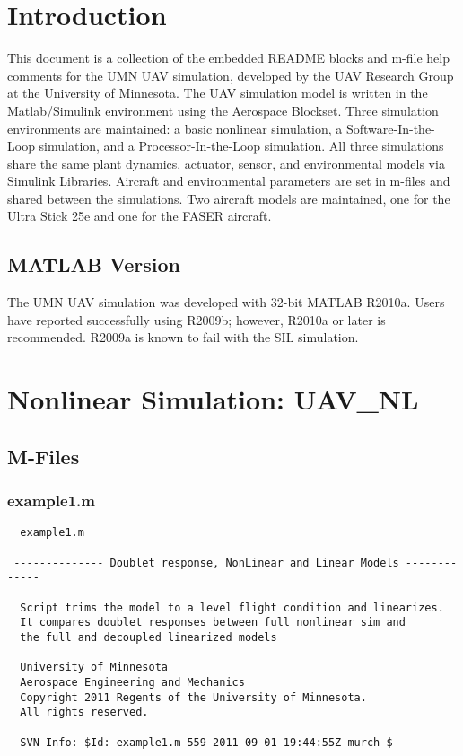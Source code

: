 \documentclass[12pt]{article}
\begin{document}
\maketitle
\tableofcontents

\section{Introduction}

This document is a collection of the embedded README blocks and m-file help comments for the UMN UAV simulation, developed by the UAV Research Group at the University of Minnesota. The UAV simulation model is written in the Matlab/Simulink environment using the Aerospace Blockset.  Three simulation environments are maintained: a basic nonlinear simulation, a Software-In-the-Loop simulation, and a Processor-In-the-Loop simulation. All three simulations share the same plant dynamics, actuator, sensor, and environmental models via Simulink Libraries. Aircraft and environmental parameters are set in m-files and shared between the simulations. Two aircraft models are maintained, one for the Ultra Stick 25e and one for the FASER aircraft.
\subsection{MATLAB Version}

The UMN UAV simulation was developed with 32-bit MATLAB R2010a. Users have reported successfully using R2009b; however, R2010a or later is recommended. R2009a is known to fail with the SIL simulation.
\section{Nonlinear Simulation: UAV\_NL}
\subsection{M-Files}
\subsubsection{example1.m}
\begin{verbatim}
  example1.m
 
 -------------- Doublet response, NonLinear and Linear Models -------------
 
  Script trims the model to a level flight condition and linearizes.
  It compares doublet responses between full nonlinear sim and 
  the full and decoupled linearized models
 
  University of Minnesota 
  Aerospace Engineering and Mechanics 
  Copyright 2011 Regents of the University of Minnesota. 
  All rights reserved.
 
  SVN Info: $Id: example1.m 559 2011-09-01 19:44:55Z murch $


\end{verbatim}
\end{document}
